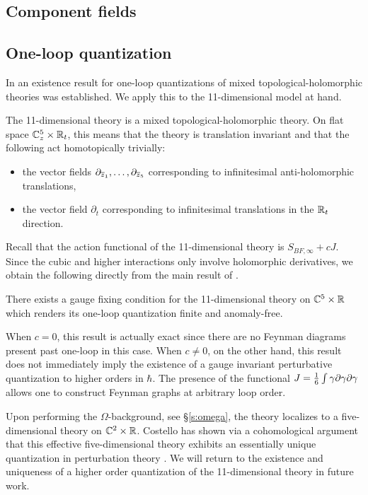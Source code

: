 \subsection{Component fields}

\subsection{One-loop quantization}

In \cite{GRWthf} an existence result for one-loop quantizations of mixed topological-holomorphic theories was established. 
We apply this to the 11-dimensional model at hand. 

The 11-dimensional theory is a mixed topological-holomorphic theory.
On flat space $\mathbb C^5_z \times \mathbb R_t$, this means that the theory is translation invariant and that the following act homotopically trivially:
\begin{itemize}
\item the vector fields $\partial_{\overline{z}_1}, \ldots, \partial_{\overline{z}_{5}}$ corresponding to infinitesimal anti-holomorphic translations,
\item the vector field $\partial_t$ corresponding to infinitesimal translations in the $\mathbb R_t$ direction. 
\end{itemize}

Recall that the action functional of the 11-dimensional theory is $S_{BF, \infty} + c J$. 
Since the cubic and higher interactions only involve holomorphic derivatives, we obtain the following directly from the main result of \cite{GRWthf}. 

\begin{thm}
There exists a gauge fixing condition for the 11-dimensional theory on $\mathbb C^5 \times \mathbb R$ which renders its one-loop quantization finite and anomaly-free. 
\end{thm} 

When $c=0$, this result is actually exact
since there are no Feynman diagrams present past one-loop in this case. 
When $c \ne 0$, on the other hand, this result does not immediately imply the existence of a gauge invariant perturbative quantization to higher orders in $\hbar$. 
The presence of the functional $J = \frac16 \int \gamma \partial \gamma \partial \gamma$ allows one to construct Feynman graphs at arbitrary loop order. 

Upon performing the $\Omega$-background, see \S \ref{s:omega}, the theory localizes to a five-dimensional theory on $\mathbb C^2 \times \mathbb R$. 
Costello has shown via a cohomological argument that this effective five-dimensional theory exhibits an essentially unique quantization in perturbation theory \cite{CostelloM5}. 
We will return to the existence and uniqueness of a higher order quantization of the 11-dimensional theory in future work. 
